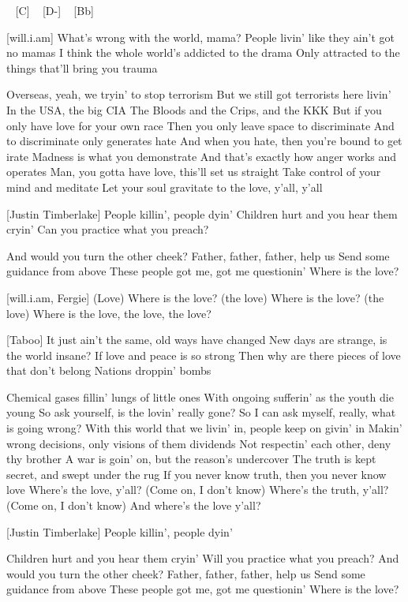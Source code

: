\begin{guitar}
[F] ~ [C] ~ [D-] ~ [Bb]

[will.i.am]
What's wrong with the world, mama?
People livin' like they ain't got no mamas
I think the whole world's addicted to the drama
Only attracted to the things that'll bring you trauma

Overseas, yeah, we tryin' to stop terrorism
But we still got terrorists here livin'
In the USA, the big CIA
The Bloods and the Crips, and the KKK
But if you only have love for your own race
Then you only leave space to discriminate
And to discriminate only generates hate
And when you hate, then you're bound to get irate
Madness is what you demonstrate
And that's exactly how anger works and operates
Man, you gotta have love, this'll set us straight
Take control of your mind and meditate
Let your soul gravitate to the love, y'all, y'all

[Justin Timberlake]
People killin', people dyin'
Children hurt and you hear them cryin'
Can you practice what you preach?

And would you turn the other cheek?
Father, father, father, help us
Send some guidance from above
These people got me, got me questionin'
Where is the love?

[will.i.am, Fergie]
(Love) Where is the love? (the love)
Where is the love? (the love)
Where is the love, the love, the love?

[Taboo]
It just ain't the same, old ways have changed
New days are strange, is the world insane?
If love and peace is so strong
Then why are there pieces of love that don't belong
Nations droppin' bombs

Chemical gases fillin' lungs of little ones
With ongoing sufferin' as the youth die young
So ask yourself, is the lovin' really gone?
So I can ask myself, really, what is going wrong?
With this world that we livin' in, people keep on givin' in
Makin' wrong decisions, only visions of them dividends
Not respectin' each other, deny thy brother
A war is goin' on, but the reason's undercover
The truth is kept secret, and swept under the rug
If you never know truth, then you never know love
Where's the love, y'all? (Come on, I don't know)
Where's the truth, y'all? (Come on, I don't know)
And where's the love y'all?

[Justin Timberlake]
People killin', people dyin'

Children hurt and you hear them cryin'
Will you practice what you preach?
And would you turn the other cheek?
Father, father, father, help us
Send some guidance from above
These people got me, got me questionin'
Where is the love?


\end{guitar}
